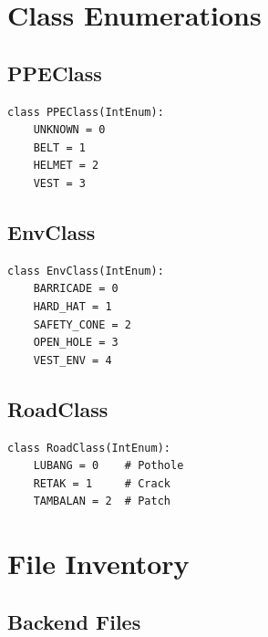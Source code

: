 \documentclass[12pt,a4paper,oneside]{book}
\begin{document}
\chapter{Class Enumerations}

\section{PPEClass}

\begin{lstlisting}[style=pythonstyle]
class PPEClass(IntEnum):
    UNKNOWN = 0
    BELT = 1
    HELMET = 2
    VEST = 3
\end{lstlisting}

\section{EnvClass}

\begin{lstlisting}[style=pythonstyle]
class EnvClass(IntEnum):
    BARRICADE = 0
    HARD_HAT = 1
    SAFETY_CONE = 2
    OPEN_HOLE = 3
    VEST_ENV = 4
\end{lstlisting}

\section{RoadClass}

\begin{lstlisting}[style=pythonstyle]
class RoadClass(IntEnum):
    LUBANG = 0    # Pothole
    RETAK = 1     # Crack
    TAMBALAN = 2  # Patch
\end{lstlisting}

\chapter{File Inventory}

\section{Backend Files}
\end{document}
